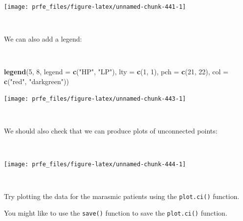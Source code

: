 \documentclass[12pt,a4paper]{book}
\newenvironment{Shaded}{\begin{snugshade}}{\end{snugshade}}
\newcommand{\KeywordTok}[1]{\textcolor[rgb]{0.13,0.29,0.53}{\textbf{#1}}}
\newcommand{\DataTypeTok}[1]{\textcolor[rgb]{0.13,0.29,0.53}{#1}}
\newcommand{\DecValTok}[1]{\textcolor[rgb]{0.00,0.00,0.81}{#1}}
\newcommand{\StringTok}[1]{\textcolor[rgb]{0.31,0.60,0.02}{#1}}
\newcommand{\OperatorTok}[1]{\textcolor[rgb]{0.81,0.36,0.00}{\textbf{#1}}}
\newcommand{\NormalTok}[1]{#1}
\theoremstyle{definition}
\theoremstyle{definition}
\theoremstyle{definition}
\theoremstyle{remark}
\begin{document}
\newpage

\begin{center}\texttt{[image: prfe\_files/figure-latex/unnamed-chunk-441-1]} \end{center}

~

We can also add a legend:

~

\begin{Shaded}
\begin{Highlighting}[]
\KeywordTok{legend}\NormalTok{(}\DecValTok{5}\NormalTok{, }\DecValTok{8}\NormalTok{, }\DataTypeTok{legend =} \KeywordTok{c}\NormalTok{(}\StringTok{"HP"}\NormalTok{, }\StringTok{"LP"}\NormalTok{), }\DataTypeTok{lty =} \KeywordTok{c}\NormalTok{(}\DecValTok{1}\NormalTok{, }\DecValTok{1}\NormalTok{),}
       \DataTypeTok{pch =} \KeywordTok{c}\NormalTok{(}\DecValTok{21}\NormalTok{, }\DecValTok{22}\NormalTok{), }\DataTypeTok{col =} \KeywordTok{c}\NormalTok{(}\StringTok{"red"}\NormalTok{, }\StringTok{"darkgreen"}\NormalTok{))}
\end{Highlighting}
\end{Shaded}

\begin{center}\texttt{[image: prfe\_files/figure-latex/unnamed-chunk-443-1]} \end{center}

~

We should also check that we can produce plots of unconnected points:

~

\begin{Shaded}
\end{Shaded}

\begin{center}\texttt{[image: prfe\_files/figure-latex/unnamed-chunk-444-1]} \end{center}

~

Try plotting the data for the marasmic patients using the
\texttt{plot.ci()} function.

You might like to use the \texttt{save()} function to save the
\texttt{plot.ci()} function.
\end{document}
